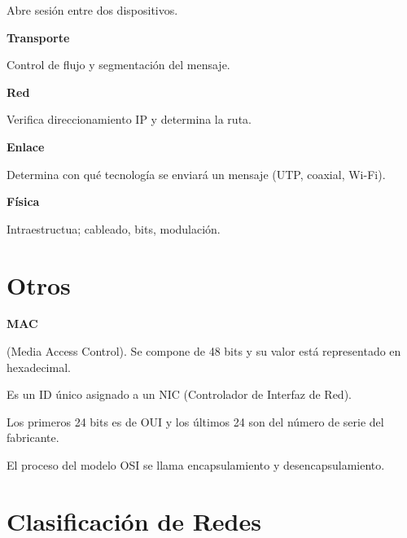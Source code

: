 \documentclass{article}
\begin{document}
Abre sesión entre dos dispositivos.
\vspace{1em}

\textbf{Transporte}

Control de flujo y segmentación del mensaje.
\vspace{1em}

\textbf{Red}

Verifica direccionamiento IP y determina la ruta.
\vspace{1em}

\textbf{Enlace}

Determina con qué tecnología se enviará un mensaje (UTP, coaxial, Wi-Fi).
\vspace{1em}

\textbf{Física}

Intraestructua; cableado, bits, modulación.
\vspace{1em}

\section{Otros}

\textbf{MAC}
\vspace{1em}

(Media Access Control). Se compone de 48 bits y su valor está representado en
hexadecimal.
\vspace{1em}

Es un ID único asignado a un NIC (Controlador de Interfaz de Red).
\vspace{1em}

Los primeros 24 bits es de OUI y los últimos 24 son del número de serie del
fabricante.
\vspace{1em}

El proceso del modelo OSI se llama encapsulamiento y desencapsulamiento.

\section{Clasificación de Redes}
\end{document}
